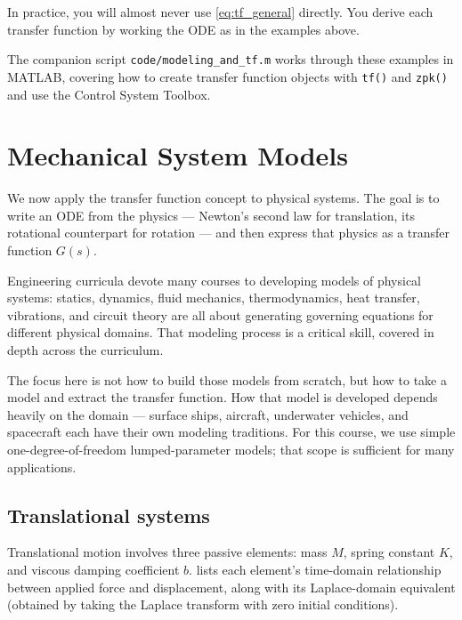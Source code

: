 \documentclass[../../book.tex]{subfiles}
\begin{document}
In practice, you will almost never use \cref{eq:tf_general} directly.  You
derive each transfer function by working the ODE as in the examples above.

The companion script \texttt{code/modeling\_and\_tf.m} works through these
examples in MATLAB, covering how to create transfer function objects with
\texttt{tf()} and \texttt{zpk()} and use the Control System Toolbox.

\section{Mechanical System Models}
\label{sec:mechanical}

We now apply the transfer function concept to physical systems.  The goal is
to write an ODE from the physics --- Newton's second law for translation,
its rotational counterpart for rotation --- and then express that physics as a transfer function $G(s)$.

Engineering curricula devote many courses to developing models of physical systems: statics, dynamics, fluid mechanics, thermodynamics, heat transfer, vibrations, and circuit theory are all about generating governing equations for different physical domains.  That modeling process is a critical skill, covered in depth across the curriculum.

The focus here is not how to build those models from scratch, but how to take a model and extract the transfer function.  How that model is developed depends heavily on the domain --- surface ships, aircraft, underwater vehicles, and spacecraft each have their own modeling traditions.  For this course, we use simple one-degree-of-freedom lumped-parameter models; that scope is sufficient for many applications.

\subsection{Translational systems}
\label{sec:translation}

Translational motion involves three passive elements: mass $M$, spring
constant $K$, and viscous damping coefficient $b$.  
lists each element's time-domain relationship between applied force and
displacement, along with its Laplace-domain equivalent (obtained by taking the
Laplace transform with zero initial conditions).
\end{document}

